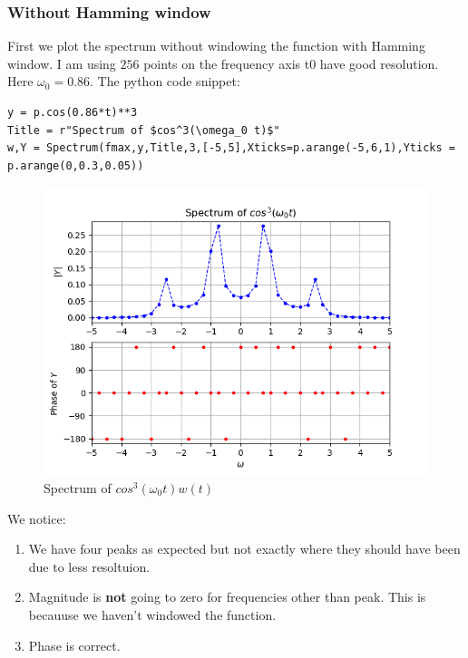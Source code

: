 \documentclass[11pt, a4paper]{article}
\begin{document}
        \subsubsection{Without Hamming window}
        First we plot the spectrum without windowing the function with Hamming window. I am using $256$ points on the frequency axis t0 have good resolution. Here $\omega_0 = 0.86$. The python code snippet:
            \begin{verbatim}
y = p.cos(0.86*t)**3
Title = r"Spectrum of $cos^3(\omega_0 t)$"
w,Y = Spectrum(fmax,y,Title,3,[-5,5],Xticks=p.arange(-5,6,1),Yticks = p.arange(0,0.3,0.05))
            \end{verbatim}
            \begin{figure}[!h]
                \centering
                \includegraphics[scale = 0.65]{Figure 3.png}
                \caption{Spectrum of $cos^3(\omega_0 t)w(t)$}
                \label{fig:Figure 3}
            \end{figure}
        We notice:
            \begin{enumerate}
            \item We have four peaks as expected but not exactly where they should have been due to less resoltuion.
            \item Magnitude is \textbf{not} going to zero for frequencies other than peak. This is becauuse we haven't windowed the function.
            \item Phase is correct.
            \end{enumerate}
\end{document}
